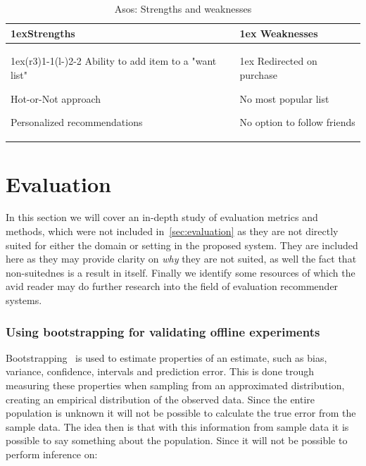 \begin{table}[H]
    \centering
    \begin{tabularx}{\linewidth}{>{\parskip1ex}X@{\kern4\tabcolsep}>{\parskip1ex}X}
        \toprule
        \hfil\bfseries Strengths
        &
        \hfil\bfseries Weaknesses
        \\\cmidrule(r{3\tabcolsep}){1-1}\cmidrule(l{-\tabcolsep}){2-2}
        Ability to add item to a "want list" \par
        Hot-or-Not approach \par
        Personalized recommendations \par
        &
        Redirected on purchase \par
        No most popular list \par
        No option to follow friends \par
        \\\bottomrule
    \end{tabularx}
    \caption{Asos: Strengths and weaknesses}
    \label{table:ecommerceMallzees}
\end{table}


\section{Evaluation}
\label{appendix:evaluation-metrics}

In this section we will cover an in-depth study of evaluation metrics and
methods, which were not included in~\ref{sec:evaluation} as they are not
directly suited for either the domain or setting in the proposed system.
They are included here as they may provide clarity on \textit{why} they are not
suited, as well the fact that non-suitednes is a result in itself. Finally we
identify some resources of which the avid reader may do further research into
the field of evaluation recommender systems.

\subsubsection{Using bootstrapping for validating offline experiments}
Bootstrapping~\cite{efron1994introduction} is used to estimate properties of an
estimate, such as bias, variance, confidence, intervals and prediction error.
This is done trough measuring these properties when sampling from an
approximated distribution, creating an empirical distribution of the observed
data.  Since the entire population is unknown it will not be possible to
calculate the true error from the sample data.  The idea then is that with this
information from sample data it is possible to say something about the
population.  Since it will not be possible to perform inference on:

